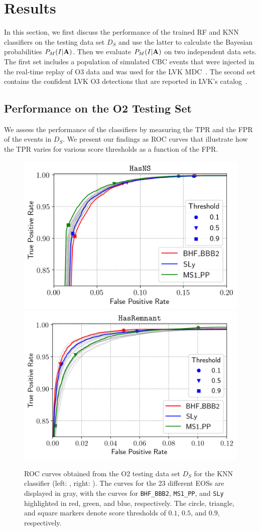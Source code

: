 \section{Results} \label{results}

In this section, we first discuss the performance of the trained \ac{RF} and \ac{KNN} classifiers on the testing data set $D_S$ and use the latter to calculate the Bayesian probabilities
$P_M(I|{\bf A})$. Then we evaluate $P_M(I|{\bf A})$ on two independent data sets. The first set includes a population of simulated \ac{CBC} events that were injected in the real-time
replay of \ac{O3} data and was used for the \ac{LVK} \ac{MDC}~\cite{Chaudhary:2023vec}. The second set contains the confident \ac{LVK} \ac{O3} detections that are reported in \ac{LVK}'s
 catalog~.

\subsection{Performance on the O2 Testing Set}

We assess the performance of the classifiers by measuring the \ac{TPR} and the \ac{FPR} of the events in $D_S$. We present our findings as \ac{ROC} curves that illustrate how the \ac{TPR}
varies for various score thresholds as a function of the \ac{FPR}.

\begin{figure}%
\includegraphics[width=0.45\linewidth]{roc_testing_KNN_NS}
\includegraphics[width=0.45\linewidth]{roc_testing_KNN_REM}
\caption{\ac{ROC} curves obtained from the \ac{O2} testing data set $D_S$ for the \ac{KNN} classifier (left: \hasns, right: \hasrem). The curves for the 23 different \ac{EOS}s are displayed in
gray, with the curves for {\tt BHF\_BBB2}, {\tt MS1\_PP}, and {\tt SLy} highlighted in red, green, and blue, respectively. The circle, triangle, and square markers denote score thresholds of
$0.1$, $0.5$, and $0.9$, respectively.}
\label{fig:rocO2_KNN}
\end{figure}

